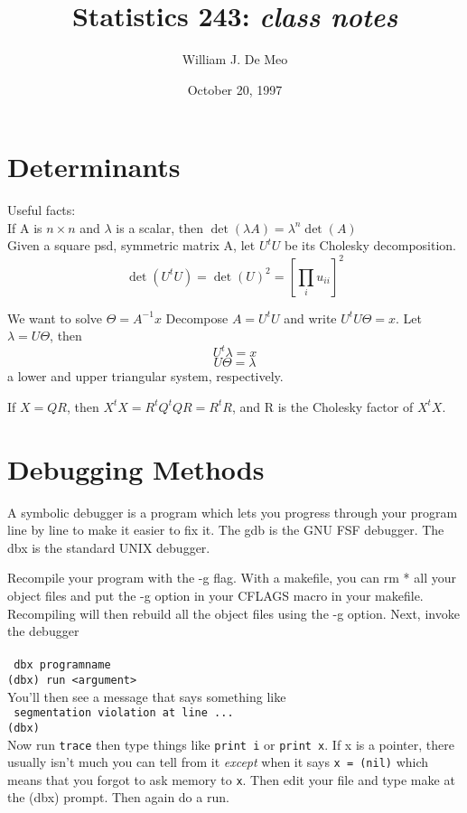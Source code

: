 \documentclass{article}
\begin{document}
\title{Statistics 243: \emph{class notes}}
\author{William J. De Meo}
\date{October 20, 1997 }
\maketitle
\section{Determinants}
Useful facts:\\
If A is $n\times n$ and $\lambda$ is a scalar, then 
$\det(\lambda A) = \lambda ^n \det(A)$\\
Given a square psd, symmetric matrix A, let $U^tU$ be its Cholesky
decomposition.
\[\det(U^tU) = \det(U)^2 = \left[\prod_i u_{ii}\right]^2\]

We want to solve $\Theta = A^{-1}x$
Decompose $A = U^tU$ and write
$U^tU\Theta = x$. Let $\lambda = U\Theta$, then
\[U^t\lambda = x\]
\[U\Theta = \lambda\]
a lower and upper triangular system, respectively.

If $X = QR$, then $X^tX = R^tQ^tQR = R^tR$, and R is the Cholesky factor
of $X^tX$.

\section{Debugging Methods}
A symbolic debugger is a program which lets you progress through
your program line by line to make it easier to fix it.
The gdb is the GNU FSF debugger. The dbx is the standard UNIX debugger.

Recompile your program with the -g flag.  With a makefile, you can 
rm * all your object files and put the -g option in your CFLAGS macro
in your makefile.  Recompiling will then rebuild all the object files
using the -g option.
Next, invoke the debugger\\\\
{\tt
dbx programname\\
(dbx) run <argument> \\
}
You'll then see a message that says something like\\
{\tt
segmentation violation at line ...\\
(dbx)\\
}
Now run {\tt trace} then type things like {\tt print i}
or {\tt print x}.  If x is a pointer, there usually isn't much
you can tell from it \emph{except} when it says {\tt x = (nil)}
which means that you forgot to ask memory to {\tt x}.  Then
edit your file and type make at the (dbx) prompt. Then again
do a run.
\end{document}

